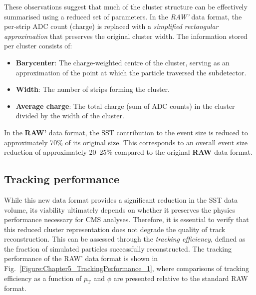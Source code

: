 These observations suggest that much of the cluster structure can be effectively summarised using a reduced set of parameters.  In the \textit{RAW'} data format, the per-strip ADC count (charge) is replaced with a \textit{simplified rectangular approximation} that preserves the original cluster width. The information stored per cluster consists of:

\begin{itemize}
    \item \textbf{Barycenter}: The charge-weighted centre of the cluster, serving as an approximation of the point at which the particle traversed the subdetector.
    \item \textbf{Width}: The number of strips forming the cluster.
    \item \textbf{Average charge}: The total charge (sum of ADC counts) in the cluster divided by the width of the cluster.
\end{itemize}

In the \textbf{RAW'} data format, the SST contribution to the event size is reduced to approximately 70\% of its original size. This corresponds to an overall event size reduction of approximately 20–25\% compared to the original \textbf{RAW} data format.

\subsection{Tracking performance}

While this new data format provides a significant reduction in the SST data volume, its viability ultimately depends on whether it preserves the physics performance necessary for CMS analyses. Therefore, it is essential to verify that this reduced cluster representation does not degrade the quality of track reconstruction. This can be assessed through the \textit{tracking efficiency}, defined as the fraction of simulated particles successfully reconstructed. The tracking performance of the RAW' data format is shown in Fig.~\ref{Figure:Chapter5_TrackingPerformance_1}, where comparisons of tracking efficiency as a function of $p_\mathrm{T}$ and $\phi$ are presented relative to the standard RAW format.

